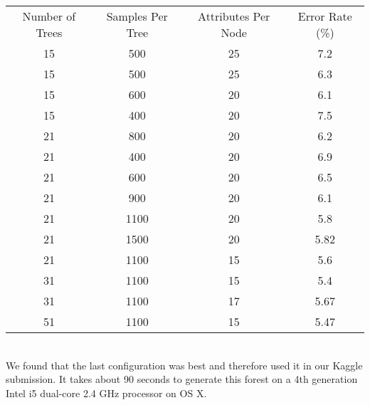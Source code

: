 \documentclass[11pt]{article}
\begin{document}
\begin{tabular}{|c|c|c||c|}
\hline
Number of Trees & Samples Per Tree & Attributes Per Node & Error Rate (\%)\\
15 & 500 & 25 & 7.2 \\
15 & 500 & 25 & 6.3 \\
15 & 600 & 20 & 6.1 \\
15 & 400 & 20 & 7.5 \\
21 & 800 & 20 & 6.2 \\
21 & 400 & 20 & 6.9 \\
21 & 600 & 20 & 6.5 \\
21 & 900 & 20 & 6.1 \\
21 & 1100 & 20 & 5.8 \\
21 & 1500 & 20 & 5.82 \\
21 & 1100 & 15 & 5.6 \\
31 & 1100 & 15 & 5.4 \\
31 & 1100 & 17 & 5.67 \\
51 & 1100 & 15 & 5.47 \\
\hline
\end{tabular}
\vspace{11pt}
\\
We found that the last configuration was best and therefore used it in our Kaggle submission. It takes about 90 seconds to generate this forest on a 4th generation Intel i5 dual-core 2.4 GHz processor on OS X. 
\end{document}
